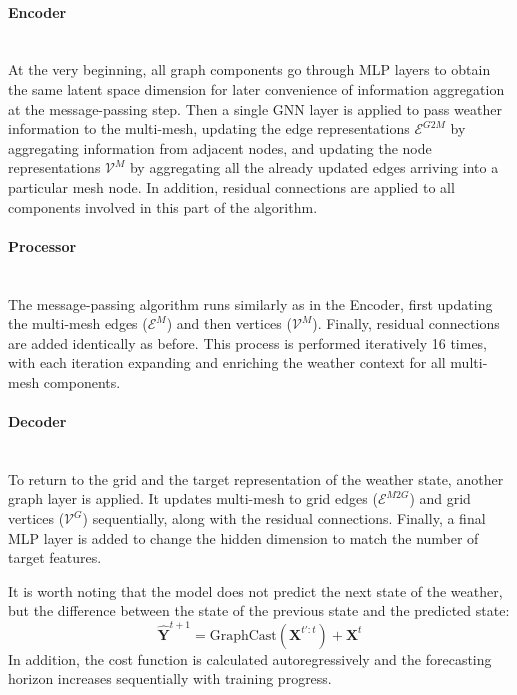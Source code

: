 \paragraph{Encoder} \mbox{} \\
\noindent At the very beginning, all graph components go through MLP layers to obtain the same latent space dimension for later convenience of information aggregation at the message-passing step. Then a single GNN layer is applied to pass weather information to the multi-mesh, updating the edge representations $\mathcal{E}^{G2M}$ by aggregating information from adjacent nodes, and updating the node representations $\mathcal{V}^M$ by aggregating all the already updated edges arriving into a particular mesh node. In addition, residual connections are applied to all components involved in this part of the algorithm.

\paragraph{Processor} \mbox{} \\
\noindent The message-passing algorithm runs similarly as in the Encoder, first updating the multi-mesh edges ($\mathcal{E}^M$) and then vertices ($\mathcal{V}^M$). Finally, residual connections are added identically as before. This process is performed iteratively 16 times, with each iteration expanding and enriching the weather context for all multi-mesh components.

\paragraph{Decoder} \mbox{} \\
\noindent To return to the grid and the target representation of the weather state, another graph layer is applied. It updates multi-mesh to grid edges ($\mathcal{E}^{M2G}$) and grid vertices ($\mathcal{V}^G$) sequentially, along with the residual connections. Finally, a final MLP layer is added to change the hidden dimension to match the number of target features. 

It is worth noting that the model does not predict the next state of the weather, but the difference between the state of the previous state and the predicted state:
\[
    \hat{\mathbf{Y}}^{t+1} = \text{GraphCast}(\mathbf{X}^{t':t}) + \mathbf{X}^t
\]
In addition, the cost function is calculated autoregressively and the forecasting horizon increases sequentially with training progress.

